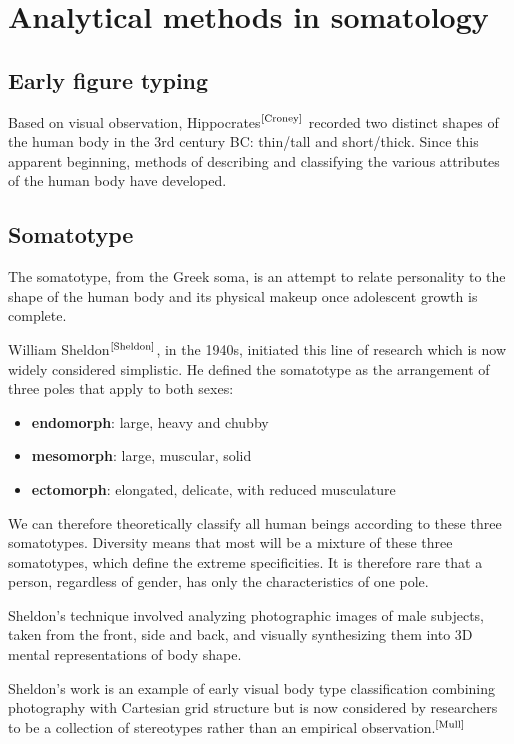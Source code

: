 \documentclass[12pt,a4paper,openany,UKenglish]{scrreprt}
\newcommand{\bib}[1]{$^\text{\cite{#1}}$}
\begin{document}
\section{Analytical methods in somatology}
\subsection{Early figure typing}
Based on visual observation, Hippocrates\bib{Croney} recorded two distinct shapes of the human body in the 3rd century BC: thin/tall and short/thick.
Since this apparent beginning, methods of describing and classifying the various attributes of the human body have developed.

\subsection{Somatotype}
The somatotype, from the Greek soma, is an attempt to relate personality to the shape of the human body and its physical makeup once adolescent growth is complete.

William Sheldon\bib{Sheldon}, in the 1940s, initiated this line of research which is now widely considered simplistic.
He defined the somatotype as the arrangement of three poles that apply to both sexes:
\begin{itemize}
	\setlength\itemsep{-0.25em}
	\item \textbf{endomorph}: large, heavy and chubby
	\item \textbf{mesomorph}: large, muscular, solid
	\item \textbf{ectomorph}: elongated, delicate, with reduced musculature
\end{itemize}
We can therefore theoretically classify all human beings according to these three somatotypes.
Diversity means that most will be a mixture of these three somatotypes, which define the extreme specificities.
It is therefore rare that a person, regardless of gender, has only the characteristics of one pole.

Sheldon's technique involved analyzing photographic images of male subjects, taken from the front, side and back, and visually synthesizing them into 3D mental representations of body shape.

Sheldon’s work is an example of early visual body type classification combining photography with Cartesian grid structure but is now considered by researchers to be a collection of stereotypes rather than an empirical observation.\bib{Mull}
\end{document}
